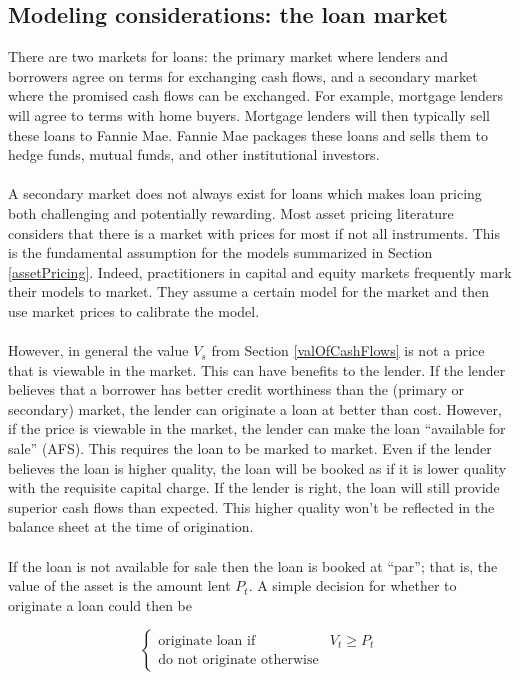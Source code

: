 \documentclass{article}
\theoremstyle{definition}
\begin{document}
\subsection{Modeling considerations: the loan market}

There are two markets for loans: the primary market where lenders and borrowers agree on terms for exchanging cash flows, and a secondary market where the promised cash flows can be exchanged.  For example, mortgage lenders will agree to terms with home buyers.  Mortgage lenders will then typically sell these loans to Fannie Mae.  Fannie Mae packages these loans and sells them to hedge funds, mutual funds, and other institutional investors.  
\\
\\
A secondary market does not always exist for loans which makes loan pricing both challenging and potentially rewarding. Most asset pricing literature considers that there is a market with prices for most if not all instruments.  This is the fundamental assumption for the models summarized in Section \ref{assetPricing}.  Indeed, practitioners in capital and equity markets frequently mark their models to market.  They assume a certain model for the market and then use market prices to calibrate the model.  
\\
\\
However, in general the value \(V_s\) from Section \ref{valOfCashFlows} is not a price that is viewable in the market.  This can have benefits to the lender.  If the lender believes that a borrower has better credit worthiness than the (primary or secondary) market, the lender can originate a loan at better than cost.  However, if the price is viewable in the market, the lender can make the loan ``available for sale'' (AFS).  This requires the loan to be marked to market.  Even if the lender believes the loan is higher quality, the loan will be booked as if it is lower quality with the requisite capital charge.  If the lender is right, the loan will still provide superior cash flows than expected.  This higher quality won't be reflected in the balance sheet at the time of origination. 
\\
\\
If the loan is not available for sale then the loan is booked at ``par''; that is, the value of the asset is the amount lent \(P_t\).  A simple decision for whether to originate a loan could then be 

\begin{equation}
\left\{
\begin{array}{ll}
\text{originate loan if} & V_t \geq P_t\\
\text{do not originate otherwise} 
\end{array} \right.
\end{equation}
\end{document}
